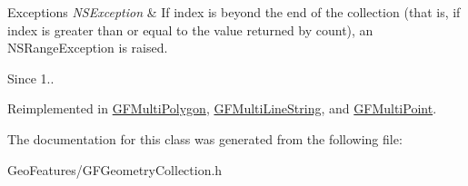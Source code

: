 \begin{DoxyExceptions}{Exceptions}
{\em N\+S\+Exception} & If index is beyond the end of the collection (that is, if index is greater than or equal to the value returned by count), an N\+S\+Range\+Exception is raised.\\
\hline
\end{DoxyExceptions}
\begin{DoxySince}{Since}
1.. 
\end{DoxySince}


Reimplemented in \hyperlink{interface_g_f_multi_polygon_ac0de2e4160cbb5e83522fc72502f681c}{G\+F\+Multi\+Polygon}, \hyperlink{interface_g_f_multi_line_string_a00496d2af8be614fe4cc11c6a6347591}{G\+F\+Multi\+Line\+String}, and \hyperlink{interface_g_f_multi_point_a003241a11b6d6da14364bb8a07c05a35}{G\+F\+Multi\+Point}.



The documentation for this class was generated from the following file\+:\begin{DoxyCompactItemize}
\item 
Geo\+Features/G\+F\+Geometry\+Collection.\+h\end{DoxyCompactItemize}
